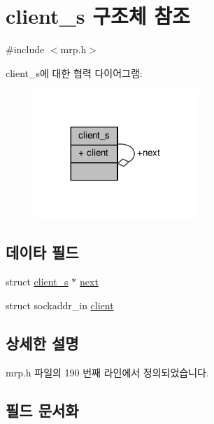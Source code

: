 \hypertarget{structclient__s}{}\section{client\+\_\+s 구조체 참조}
\label{structclient__s}


{\ttfamily \#include $<$mrp.\+h$>$}



client\+\_\+s에 대한 협력 다이어그램\+:
\nopagebreak
\begin{figure}[H]
\begin{center}
\leavevmode
\includegraphics[width=176pt]{structclient__s__coll__graph}
\end{center}
\end{figure}
\subsection*{데이타 필드}
\begin{DoxyCompactItemize}
\item 
struct \hyperlink{structclient__s}{client\+\_\+s} $\ast$ \hyperlink{structclient__s_af3acd6523ace0fc96b77f04cf1b88d06}{next}
\item 
struct sockaddr\+\_\+in \hyperlink{structclient__s_abf7df3c8f5ff035f1843f41668a2168c}{client}
\end{DoxyCompactItemize}


\subsection{상세한 설명}


mrp.\+h 파일의 190 번째 라인에서 정의되었습니다.



\subsection{필드 문서화}
